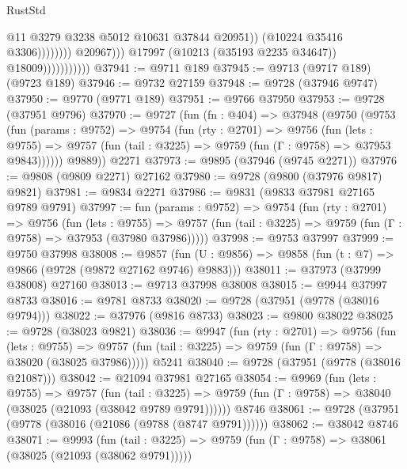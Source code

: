 \begin{lexlean}{RustStd}
\begin{coremodule}
{\begin{coremodule}
{{{{{{{{{{{{{{{{{{{{{{{{{{                                                  @11
                                                  @3279
                                                  @3238
                                                  @5012
                                                  @10631
                                                  @37844
                                                  @20951))
                                              (@10224 @35416 @3306))))))))
                                @20967)))
                          @17997
                          (@10213 (@35193 @2235 @34647))
                          @18009)))))))))))
@37941 := @9711 @189
@37945 := @9713 (@9717 @189) (@9723 @189)
@37946 := @9732 @27159
@37948 := @9728 (@37946 @9747)
@37950 := @9770 (@9771 @189)
@37951 := @9766 @37950
@37953 := @9728 (@37951 @9796)
@37970 := @9727
    (fun (fn : @404) =>
    @37948
      (@9750
        (@9753
          (fun (params : @9752) =>
          @9754
            (fun (rty : @2701) =>
            @9756
              (fun (lets : @9755) =>
              @9757 (fun (tail : @3225) => @9759 (fun (Γ : @9758) => @37953 @9843))))))
        @9889))
    @2271
@37973 := @9895 (@37946 (@9745 @2271))
@37976 := @9808 (@9809 @2271) @27162
@37980 := @9728 (@9800 (@37976 @9817) @9821)
@37981 := @9834 @2271
@37986 := @9831 (@9833 @37981 @27165 @9789 @9791)
@37997 := fun (params : @9752) =>
  @9754
    (fun (rty : @2701) =>
    @9756
      (fun (lets : @9755) =>
      @9757 (fun (tail : @3225) => @9759 (fun (Γ : @9758) => @37953 (@37980 @37986)))))
@37998 := @9753 @37997
@37999 := @9750 @37998
@38008 := @9857
    (fun (U : @9856) => @9858 (fun (t : @7) => @9866 (@9728 (@9872 @27162 @9746) @9883)))
@38011 := @37973 (@37999 @38008) @27160
@38013 := @9713 @37998 @38008
@38015 := @9944 @37997 @8733
@38016 := @9781 @8733
@38020 := @9728 (@37951 (@9778 (@38016 @9794)))
@38022 := @37976 (@9816 @8733)
@38023 := @9800 @38022
@38025 := @9728 (@38023 @9821)
@38036 := @9947
    (fun (rty : @2701) =>
    @9756
      (fun (lets : @9755) =>
      @9757 (fun (tail : @3225) => @9759 (fun (Γ : @9758) => @38020 (@38025 @37986)))))
    @5241
@38040 := @9728 (@37951 (@9778 (@38016 @21087)))
@38042 := @21094 @37981 @27165
@38054 := @9969
    (fun (lets : @9755) =>
    @9757
      (fun (tail : @3225) =>
      @9759 (fun (Γ : @9758) => @38040 (@38025 (@21093 (@38042 @9789 @9791))))))
    @8746
@38061 := @9728 (@37951 (@9778 (@38016 (@21086 (@9788 (@8747 @9791))))))
@38062 := @38042 @8746
@38071 := @9993
    (fun (tail : @3225) => @9759 (fun (Γ : @9758) => @38061 (@38025 (@21093 (@38062 @9791)))))
}}}}}}}}}}}}}}}}}}}}}}}}}}
\end{coremodule}}
\end{coremodule}
\end{lexlean}
